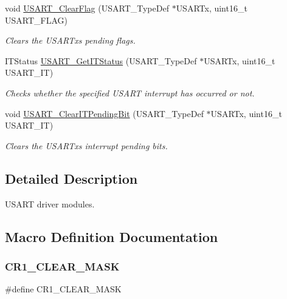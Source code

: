 \begin{DoxyCompactItemize}
void \mbox{\hyperlink{group___u_s_a_r_t_gad962e148fc466ae1b45b288f6c91d966}{U\+S\+A\+R\+T\+\_\+\+Clear\+Flag}} (U\+S\+A\+R\+T\+\_\+\+Type\+Def $\ast$U\+S\+A\+R\+Tx, uint16\+\_\+t U\+S\+A\+R\+T\+\_\+\+F\+L\+AG)
\begin{DoxyCompactList}\small\item\em Clears the U\+S\+A\+R\+Tx\textquotesingle{}s pending flags. \end{DoxyCompactList}\item 
I\+T\+Status \mbox{\hyperlink{group___u_s_a_r_t_ga93d8f031241bcdbe938d091a85295445}{U\+S\+A\+R\+T\+\_\+\+Get\+I\+T\+Status}} (U\+S\+A\+R\+T\+\_\+\+Type\+Def $\ast$U\+S\+A\+R\+Tx, uint16\+\_\+t U\+S\+A\+R\+T\+\_\+\+IT)
\begin{DoxyCompactList}\small\item\em Checks whether the specified U\+S\+A\+RT interrupt has occurred or not. \end{DoxyCompactList}\item 
void \mbox{\hyperlink{group___u_s_a_r_t_ga1fc25d0338695063be5e50156955d9bc}{U\+S\+A\+R\+T\+\_\+\+Clear\+I\+T\+Pending\+Bit}} (U\+S\+A\+R\+T\+\_\+\+Type\+Def $\ast$U\+S\+A\+R\+Tx, uint16\+\_\+t U\+S\+A\+R\+T\+\_\+\+IT)
\begin{DoxyCompactList}\small\item\em Clears the U\+S\+A\+R\+Tx\textquotesingle{}s interrupt pending bits. \end{DoxyCompactList}\end{DoxyCompactItemize}


\subsection{Detailed Description}
U\+S\+A\+RT driver modules. 



\subsection{Macro Definition Documentation}
\mbox{\label{group___u_s_a_r_t_ga8d425258898b4af4ebc820f52635fad8}} 
\subsubsection{\texorpdfstring{C\+R1\+\_\+\+C\+L\+E\+A\+R\+\_\+\+M\+A\+SK}{CR1\_CLEAR\_MASK}}
{\footnotesize\ttfamily \#define C\+R1\+\_\+\+C\+L\+E\+A\+R\+\_\+\+M\+A\+SK}

